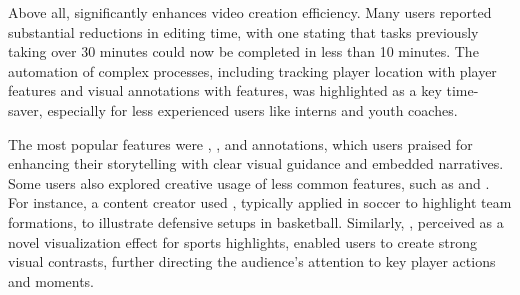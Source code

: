 

Above all, \SB{} significantly enhances video creation efficiency. Many users reported substantial reductions in editing time, with one stating that tasks previously taking over 30 minutes could now be completed in less than 10 minutes. The automation of complex processes, including tracking player location with player features and visual annotations with \Text{} features, was highlighted as a key time-saver, especially for less experienced users like interns and youth coaches.



The most popular features were \Spotlight{}, \Circle{}, and \Text{} annotations, which users praised for enhancing their storytelling with clear visual guidance and embedded narratives. Some users also explored creative usage of less common features, such as \Connector{} and \BGFilter{}. For instance, a content creator used \Connector{}, typically applied in soccer to highlight team formations, to illustrate defensive setups in basketball. Similarly, \BGFilter{}, perceived as a novel visualization effect for sports highlights, enabled users to create strong visual contrasts, further directing the audience's attention to key player actions and moments.


